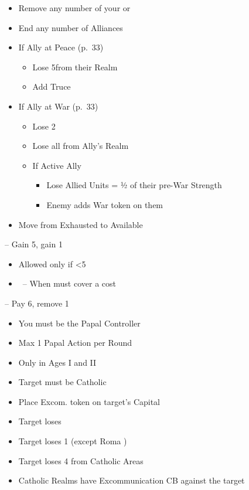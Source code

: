 \documentclass[10pt]{article}
\begin{document}
\begin{itemize}
	\item Remove any number of your \influence or \claims
	\item End any number of Alliances
	\item If Ally at Peace (p.~33)
	\begin{itemize}
		\item Lose 5\influence from their Realm
		\item Add Truce
	\end{itemize}
	\item If Ally at War (p.~33)
	\begin{itemize}
		\item Lose 2\stability
		\item Lose all \influence from Ally's Realm
		\item If Active Ally
		\begin{itemize}
			\item Lose Allied Units = ½ of their pre-War Strength
			\item Enemy adds War token on them
		\end{itemize}
	\end{itemize}
\end{itemize}

\begin{itemize}
	\item Move \manpower from Exhausted to Available
\end{itemize}

 -- Gain 5\ducats, gain 1\interest
\begin{itemize}
	\item Allowed only if <5\interest
	\item \reaction~-- When must cover a cost
\end{itemize}
 -- Pay 6\ducats, remove 1\interest

\begin{itemize}
	\item You must be the Papal Controller
	\item Max 1 Papal Action per Round
	\item Only in Ages I and II
\end{itemize}

\begin{itemize}
	\item Target must be Catholic
	\item Place Excom. token on target's Capital
	\item Target loses 
	\item Target loses 1 \cardinal (except Roma \cardinal)
	\item Target loses 4 \influence from Catholic Areas
	\item Catholic Realms have Excommunication CB against the target
\end{itemize}
\end{document}
